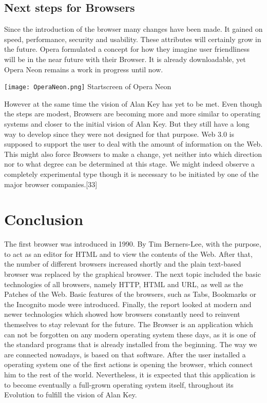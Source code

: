 \documentclass[runningheads]{llncs}
\begin{document}
		\subsection{Next steps for Browsers}
			Since the introduction of the browser many changes have been made. It gained on speed, performance, security and usability. These attributes will certainly grow in the future.
			Opera formulated a concept for how they imagine user friendliness will be in the near future with their Browser. It is already downloadable, yet Opera Neon remains a work in progress until now.
		 	\begin{center}
		 		\texttt{[image: OperaNeon.png]}
		 		Startscreen of Opera Neon
		 	\end{center}
		 	
		 	However at the same time the vision of Alan Key has yet to be met.
			Even though the steps are modest, Browsers are becoming more and more similar to operating systems and closer to the initial vision of Alan Key. But they still have a long way to develop since they were not designed for that purpose.
			\newline
			Web 3.0 is supposed to support the user to deal with the amount of information on the Web. This might also force Browsers to make a change, yet neither into which direction nor to what degree can be determined at this stage. We might indeed observe a completely experimental type though it is necessary to be initiated by one of the major browser companies.[33]
	\section{Conclusion}	
	The first browser was introduced in 1990. By Tim Berners-Lee, with the purpose, to act as an editor for HTML and to view the contents of the Web. After that, the number of different browsers increased shortly and the plain text-based browser was replaced by the graphical browser. The next topic included the basic technologies of all browsers, namely HTTP, HTML and URL, as well as the Patches of the Web. Basic features of the browsers, such as Tabs, Bookmarks or the Incognito mode were introduced. Finally, the report looked at modern and newer technologies which showed how browsers constantly need to reinvent themselves to stay relevant for the future.
	The Browser is an application which can not be forgotten on any modern operating system these days, as it is one of the standard programs that is already installed from the beginning. The way we are connected nowadays, is based on that software. After the user installed a operating system one of the first actions is opening the browser, which connect him to the rest of the world.
	\newline
	Nevertheless, it is expected that this application is to become eventually a full-grown operating system itself, throughout its Evolution to fulfill the vision of Alan Key.
\end{document}
